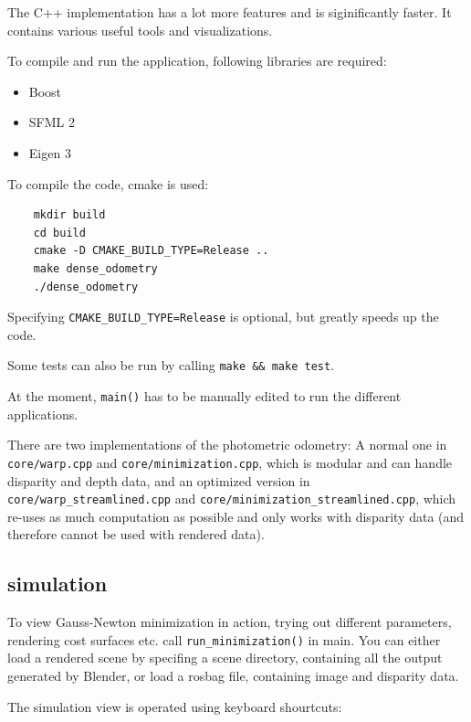 The C++ implementation has a lot more features and is siginificantly faster. It
contains various useful tools and visualizations.

To compile and run the application, following libraries are required:

\begin{itemize}
    \item Boost
    \item SFML 2
    \item Eigen 3
\end{itemize}

To compile the code, cmake is used:

\begin{verbatim}
    mkdir build
    cd build
    cmake -D CMAKE_BUILD_TYPE=Release ..
    make dense_odometry
    ./dense_odometry
\end{verbatim}

Specifying \texttt{CMAKE\_BUILD\_TYPE=Release} is optional, but greatly speeds up the code.

Some tests can also be run by calling \texttt{make \&\& make test}.

At the moment, \texttt{main()} has to be manually edited to run the different applications.

There are two implementations of the photometric odometry: A normal one in
\texttt{core/warp.cpp} and \texttt{core/minimization.cpp}, which is modular and
can handle disparity and depth data, and an optimized version in
\texttt{core/warp\_streamlined.cpp} and
\texttt{core/minimization\_streamlined.cpp}, which re-uses as much computation
as possible and only works with disparity data (and therefore cannot be used
with rendered data).

\subsection{simulation}

To view Gauss-Newton minimization in action, trying out different parameters,
rendering cost surfaces etc. call \texttt{run\_minimization()} in main. You can
either load a rendered scene by specifing a scene directory, containing all the
output generated by Blender, or load a rosbag file, containing image and
disparity data.

The simulation view is operated using keyboard shourtcuts:

